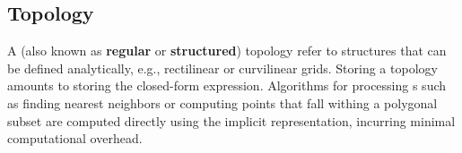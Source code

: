 \subsection{\cgrid{} Topology}
A \cgrid{} (also known as {\bf regular} or {\bf structured}) topology
refer to structures that can be defined analytically, e.g.,
rectilinear or curvilinear grids. Storing a \cgrid{} topology amounts
to storing the closed-form expression. Algorithms for processing
\cgrid{}s such as finding nearest neighbors or computing points that
fall withing a polygonal subset are computed directly using the
implicit \cgrid{} representation, incurring minimal computational
overhead.
